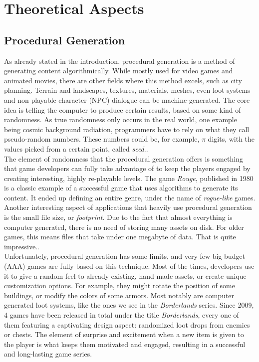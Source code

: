 \chapter{Theoretical Aspects}

\pagestyle{fancy}

\label{theoreticalAspects}

\section{Procedural Generation}

As already stated in the introduction, procedural generation is a method of generating content algorithmically. While mostly used for video games and animated movies, there are other fields where this method excels, such as city planning. Terrain and landscapes, textures, materials, meshes, even loot systems and non playable character (NPC) dialogue can be machine-generated. The core idea is telling the computer to produce certain results, based on some kind of randomness. As true randomness only occurs in the real world, one example being cosmic background radiation, programmers have to rely on what they call pseudo-random numbers. These numbers could be, for example, $\pi$ digits, with the values picked from a certain point, called \textit{seed}.\cite{procgenwiki}.\\

The element of randomness that the procedural generation offers is something that game developers can fully take advantage of to keep the players engaged by creating interesting, highly re-playable levels. The game \textit{Rouge}, published in 1980 is a classic example of a successful game that uses algorithms to generate its content. It ended up defining an entire genre, under the name of \textit{rogue-like} games. Another interesting aspect of applications that heavily use procedural generation is the small file size, or \textit{footprint}. Due to the fact that almost everything is computer generated, there is no need of storing many assets on disk. For older games, this means files that take under one megabyte of data. That is quite impressive.\cite{freiknecht2017survey}.\\

Unfortunately, procedural generation has some limits, and very few big budget (AAA) games are fully based on this technique. Most of the times, developers use it to give a random feel to already existing, hand-made assets, or create unique customization options. For example, they might rotate the position of some buildings, or modify the colors of some armors. Most notably are computer generated loot systems, like the ones we see in the \textit{Borderlands} series. Since 2009, 4 games have been released in total under the title \textit{Borderlands}, every one of them featuring a captivating design aspect: randomized loot drops from enemies or chests. The element of surprise and excitement when a new item is given to the player is what keeps them motivated and engaged, resulting in a successful and long-lasting game series\cite{borderlands}.\\

